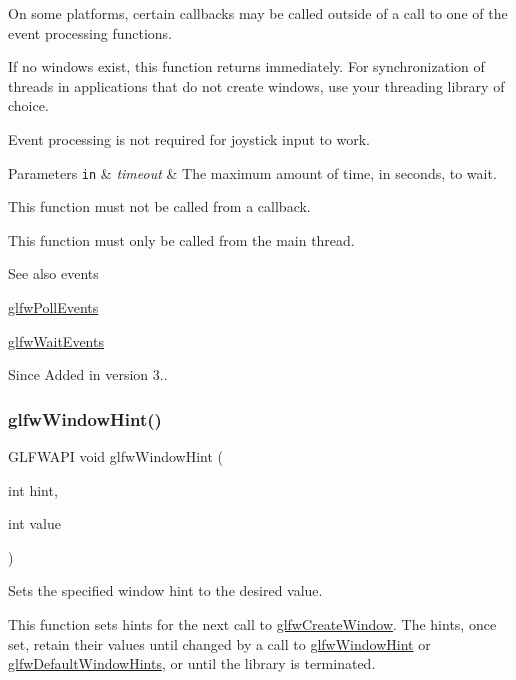 On some platforms, certain callbacks may be called outside of a call to one of the event processing functions.

If no windows exist, this function returns immediately. For synchronization of threads in applications that do not create windows, use your threading library of choice.

Event processing is not required for joystick input to work.


\begin{DoxyParams}[1]{Parameters}
\mbox{\tt in}  & {\em timeout} & The maximum amount of time, in seconds, to wait.\\
\hline
\end{DoxyParams}
This function must not be called from a callback.

This function must only be called from the main thread.

\begin{DoxySeeAlso}{See also}
events 

\hyperlink{group__window_ga872d16e4c77f58c0436f356255920cfc}{glfw\+Poll\+Events} 

\hyperlink{group__window_ga6e042d05823c11e11c7339b81a237738}{glfw\+Wait\+Events}
\end{DoxySeeAlso}
\begin{DoxySince}{Since}
Added in version 3.. 
\end{DoxySince}
\mbox{\label{group__window_ga69c40728499720bef8a49aa925ea0efa}} 
\subsubsection{\texorpdfstring{glfw\+Window\+Hint()}{glfwWindowHint()}}
{\footnotesize\ttfamily G\+L\+F\+W\+A\+PI void glfw\+Window\+Hint (\begin{DoxyParamCaption}\item[{int}]{hint,  }\item[{int}]{value }\end{DoxyParamCaption})}



Sets the specified window hint to the desired value. 

This function sets hints for the next call to \hyperlink{group__window_ga680a02abe0e4494b6759d5703240713e}{glfw\+Create\+Window}. The hints, once set, retain their values until changed by a call to \hyperlink{group__window_ga69c40728499720bef8a49aa925ea0efa}{glfw\+Window\+Hint} or \hyperlink{group__window_ga8050ddceed9dc6bd9d3aa35666195cd4}{glfw\+Default\+Window\+Hints}, or until the library is terminated.

